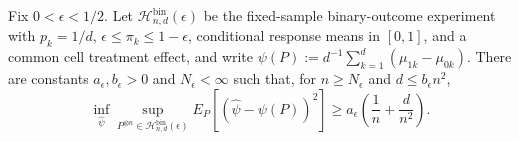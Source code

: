 Fix \(0<\epsilon<1/2\).  Let \(\mathcal H_{n,d}^{\mathrm{bin}}(\epsilon)\) be the fixed-sample binary-outcome experiment with \(p_k=1/d\), \(\epsilon\le\pi_k\le1-\epsilon\), conditional response means in \([0,1]\), and a common cell treatment effect, and write \(\psi(P):=d^{-1}\sum_{k=1}^d(\mu_{1k}-\mu_{0k})\).  There are constants \(a_{\epsilon},b_{\epsilon}>0\) and \(N_{\epsilon}<\infty\) such that, for \(n\ge N_{\epsilon}\) and \(d\le b_{\epsilon}n^2\),
\[
 \inf_{\widehat\psi}\sup_{P^{\otimes n}\in\mathcal H_{n,d}^{\mathrm{bin}}(\epsilon)}
 E_P[(\widehat\psi-\psi(P))^2]
 \ge a_{\epsilon}\left(\frac1n+\frac d{n^2}\right).
\]